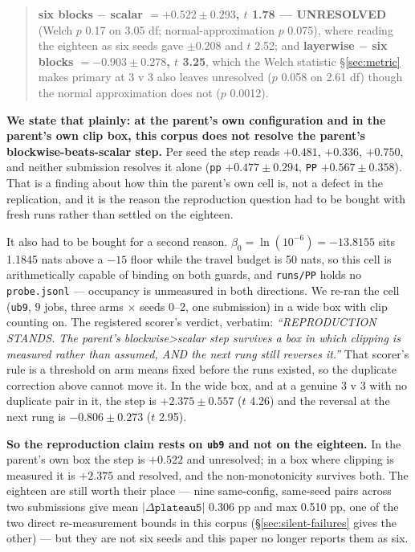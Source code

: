 \documentclass[10pt,letterpaper]{article}
\newcommand{\plateau}{\texttt{plateau5}}
\newcommand{\arm}[1]{\texttt{#1}}
\begin{document}
\begin{quote}
\textbf{six blocks $-$ scalar $= +0.522 \pm 0.293$, $t$ 1.78 --- UNRESOLVED} (Welch $p$ 0.17 on
3.05 df; normal-approximation $p$ 0.075), where reading the eighteen as six seeds gave
$\pm 0.208$ and $t$ 2.52; and \textbf{layerwise $-$ six blocks $= -0.903 \pm 0.278$, $t$ 3.25},
which the Welch statistic \S\ref{sec:metric} makes primary at 3 v 3 also leaves unresolved
($p$ 0.058 on 2.61 df) though the normal approximation does not ($p$ 0.0012).
\end{quote}

\textbf{We state that plainly: at the parent's own configuration and in the parent's own clip box,
this corpus does not resolve the parent's blockwise-beats-scalar step.} Per seed the step reads
$+0.481$, $+0.336$, $+0.750$, and neither submission resolves it alone (\arm{pp}
$+0.477 \pm 0.294$, \arm{PP} $+0.567 \pm 0.358$). That is a finding about how thin the parent's
own cell is, not a defect in the replication, and it is the reason the reproduction question had
to be bought with fresh runs rather than settled on the eighteen.

It also had to be bought for a second reason. $\beta_0 = \ln(10^{-6}) = -13.8155$ sits
1.1845 nats above a $-15$ floor while the travel budget is 50 nats, so this cell is
arithmetically capable of binding on both guards, and \texttt{runs/PP} holds no
\texttt{probe.jsonl} --- occupancy is unmeasured in both directions. We re-ran the cell
(\arm{ub9}, 9 jobs, three arms $\times$ seeds 0--2, one submission) in a
wide box with clip counting on. The registered scorer's verdict, verbatim: \emph{``REPRODUCTION
STANDS. The parent's blockwise>scalar step survives a box in which clipping is measured rather
than assumed, AND the next rung still reverses it.''} That scorer's rule is a threshold on arm
means fixed before the runs existed, so the duplicate correction above cannot move it. In the
wide box, and at a genuine 3 v 3 with no duplicate pair in it, the step is
$\mathbf{+2.375 \pm 0.557}$ ($t$ 4.26) and the reversal at the next rung is
$\mathbf{-0.806 \pm 0.273}$ ($t$ 2.95).

\textbf{So the reproduction claim rests on \arm{ub9} and not on the eighteen.} In the parent's own
box the step is $+0.522$ and unresolved; in a box where clipping is measured it is $+2.375$ and
resolved, and the non-monotonicity survives both. The eighteen are still worth their place ---
nine same-config, same-seed pairs across two submissions give mean $|\Delta \plateau|$ 0.306 pp
and max 0.510 pp, one of the two direct re-measurement bounds in this corpus
(\S\ref{sec:silent-failures} gives the other) --- but they are not six seeds and this paper no
longer reports them as six.
\end{document}
